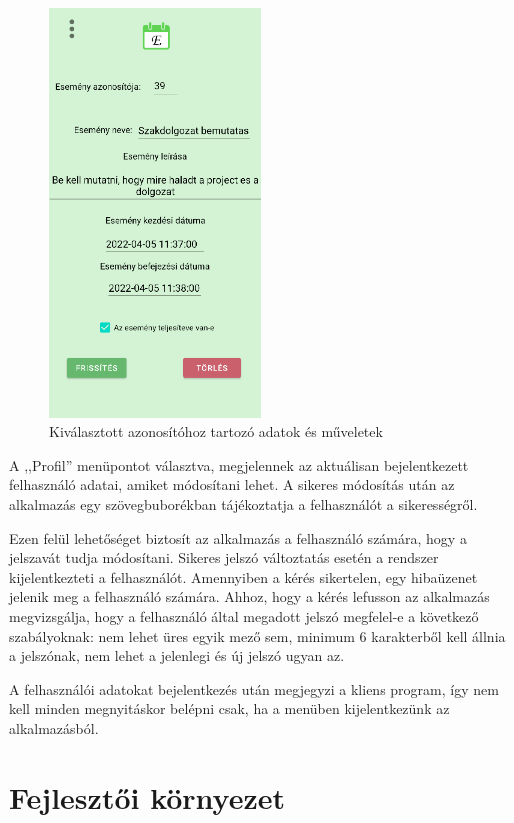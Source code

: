 \documentclass[
]{thesis-ekf}
\theoremstyle{definition}
\theoremstyle{remark}
\begin{document}
	\begin{figure}[ht!]
		\centering
		\includegraphics[width=0.5\textwidth]{android_app/android_specify_event}
		\caption{Kiválasztott azonosítóhoz tartozó adatok és műveletek}
		\label{figure:android_specify_event}
	\end{figure}
	
	A ,,Profil'' menüpontot választva, megjelennek az aktuálisan bejelentkezett felhasználó adatai, amiket módosítani lehet. A sikeres módosítás után az alkalmazás egy szövegbuborékban tájékoztatja a felhasználót a sikerességről. 
	
	Ezen felül lehetőséget biztosít az alkalmazás a felhasználó számára, hogy a jelszavát tudja módosítani. Sikeres jelszó változtatás esetén a rendszer kijelentkezteti a felhasználót. Amennyiben a kérés sikertelen, egy hibaüzenet jelenik meg a felhasználó számára. Ahhoz, hogy a kérés lefusson az alkalmazás megvizsgálja, hogy a felhasználó által megadott jelszó megfelel-e a következő szabályoknak: nem lehet üres egyik mező sem, minimum 6 karakterből kell állnia a jelszónak, nem lehet a jelenlegi és új jelszó ugyan az.
	
	A felhasználói adatokat bejelentkezés után megjegyzi a kliens program, így nem kell minden megnyitáskor belépni csak, ha a menüben kijelentkezünk az alkalmazásból. 
	
	\chapter{Fejlesztői környezet}
\end{document}

